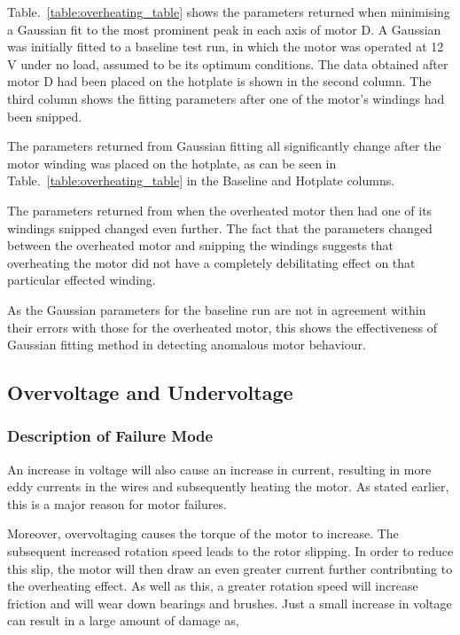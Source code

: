 Table.~\ref{table:overheating_table} shows the parameters returned when minimising a Gaussian fit to the most prominent peak in each axis of motor D. A Gaussian was initially fitted to a baseline test run, in which the motor was operated at 12 V under no load, assumed to be its optimum conditions. The data obtained after motor D had been placed on the hotplate is shown in the second column. The third column shows the fitting parameters after one of the motor's windings had been snipped. 

The parameters returned from Gaussian fitting all significantly change after the motor winding was placed on the hotplate, as can be seen in Table.~\ref{table:overheating_table} in the Baseline and Hotplate columns.

The parameters returned from when the overheated motor then had one of its windings snipped changed even further. The fact that the parameters changed between the overheated motor and snipping the windings suggests that overheating the motor did not have a completely debilitating effect on that particular effected winding.

As the Gaussian parameters for the baseline run are not in agreement within their errors with those for the overheated motor, this shows the effectiveness of Gaussian fitting method in detecting anomalous motor behaviour. 

\subsection{Overvoltage and Undervoltage}

\subsubsection{Description of Failure Mode}
An increase in voltage will also cause an increase in current, resulting in more eddy currents in the wires and subsequently heating the motor. As stated earlier, this is a major reason for motor failures. 

Moreover, overvoltaging causes the torque of the motor to increase. The subsequent increased rotation speed leads to the rotor slipping. In order to reduce this slip, the motor will then draw an even greater current further contributing to the overheating effect. As well as this, a greater rotation speed will increase friction and will wear down bearings and brushes. Just a small increase in voltage can result in a large amount of damage as,

